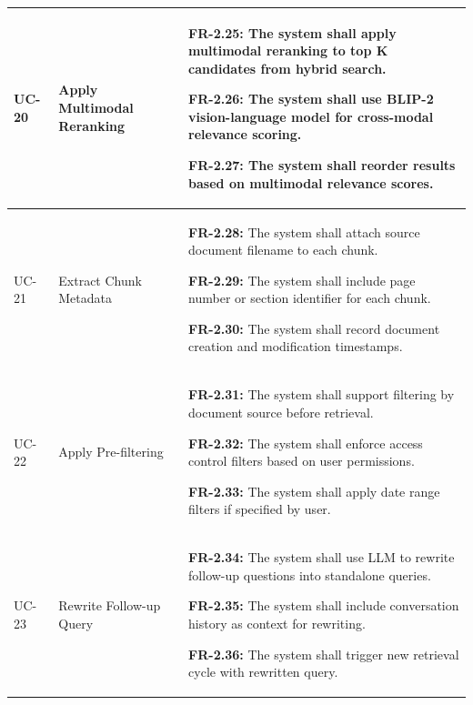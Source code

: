 \begin{longtable}{|>{\raggedright\arraybackslash}p{}|>{\raggedright\arraybackslash}p{}|>{\raggedright\arraybackslash}p{}|}
UC-20 & Apply Multimodal Reranking &
\begin{frequirements}
\item \textbf{FR-2.25:} The system shall apply multimodal reranking to top K candidates from hybrid search.
\item \textbf{FR-2.26:} The system shall use BLIP-2 vision-language model for cross-modal relevance scoring.
\item \textbf{FR-2.27:} The system shall reorder results based on multimodal relevance scores.
\end{frequirements} \\
\hline

UC-21 & Extract Chunk Metadata &
\begin{frequirements}
\item \textbf{FR-2.28:} The system shall attach source document filename to each chunk.
\item \textbf{FR-2.29:} The system shall include page number or section identifier for each chunk.
\item \textbf{FR-2.30:} The system shall record document creation and modification timestamps.
\end{frequirements} \\
\hline

UC-22 & Apply Pre-filtering &
\begin{frequirements}
\item \textbf{FR-2.31:} The system shall support filtering by document source before retrieval.
\item \textbf{FR-2.32:} The system shall enforce access control filters based on user permissions.
\item \textbf{FR-2.33:} The system shall apply date range filters if specified by user.
\end{frequirements} \\
\hline

UC-23 & Rewrite Follow-up Query &
\begin{frequirements}
\item \textbf{FR-2.34:} The system shall use LLM to rewrite follow-up questions into standalone queries.
\item \textbf{FR-2.35:} The system shall include conversation history as context for rewriting.
\item \textbf{FR-2.36:} The system shall trigger new retrieval cycle with rewritten query.
\end{frequirements} \\
\hline


\end{longtable}
